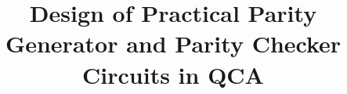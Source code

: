 \documentclass[conference]{IEEEtran}
\begin{document}
%
\title{Design of Practical Parity Generator and Parity Checker Circuits in QCA}





% 
\end{document}
